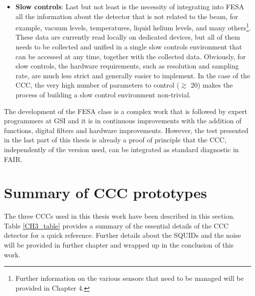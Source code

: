 \documentclass[12pt,a4paper]{report}
\begin{document}
\begin{itemize}
       	\item \textbf{Slow controls}: Last but not least is the necessity of integrating into FESA all the information about the detector that is not related to the beam, for example, vacuum levels, temperatures, liquid helium levels, and many others\footnote{Further information on the various sensors that need to be managed will be provided in Chapter 4.}. These data are currently read locally on dedicated devices, but all of them needs to be collected and unified in a single slow controls environment that can be accessed at any time, together with the collected data. Obviously, for slow controls, the hardware requirements, such as resolution and sampling rate, are much less strict and generally easier to implement. In the case of the CCC, the very high number of parameters to control ($\gtrsim$ 20) makes the process of building a slow control environment non-trivial.
       	
       \end{itemize}
       The development of the FESA class is a complex work that is followed by expert programmers at GSI and it is in continuous improvements with the addition of functions, digital filters and hardware improvements. However, the test presented in the last part of this thesis is already a proof of principle that the CCC, independently of the version used, can be integrated as standard diagnostic in FAIR.
       
       \section{Summary of CCC prototypes}
       The three CCCs used in this thesis work have been described in this section. Table \ref{CH3_table} provides a summary of the essential details of the CCC detector for a quick reference. Further details about the SQUIDs and the noise will be provided in further chapter and wrapped up in the conclusion of this work.
       
\end{document}

